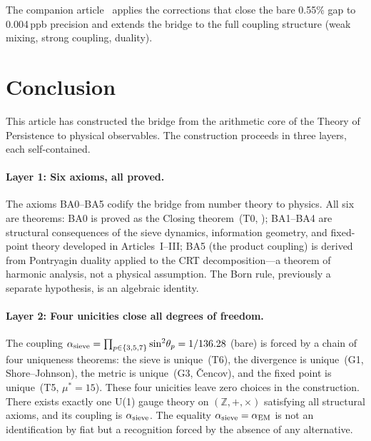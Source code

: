 \documentclass[12pt,a4paper]{article}
\begin{document}
\medskip
The companion article~\cite{companion_physics} applies the corrections that close the bare 0.55\% gap
to 0.004\,ppb precision and extends the bridge to the full
coupling structure (weak mixing, strong coupling, duality).


\newpage

\section{Conclusion}
\label{sec:conclusion}

This article has constructed the bridge from the arithmetic core of
the Theory of Persistence to physical observables.  The construction
proceeds in three layers, each self-contained.

\paragraph{Layer 1: Six axioms, all proved.}
The axioms BA0--BA5 codify the bridge from number theory to physics.
All six are theorems: BA0 is proved as the Closing theorem~(T0,
\cite{companion_M3}); BA1--BA4 are structural consequences of the
sieve dynamics, information geometry, and fixed-point theory developed
in Articles~I--III; BA5 (the product coupling) is derived from
Pontryagin duality applied to the CRT decomposition---a theorem of
harmonic analysis, not a physical assumption.  The Born rule, previously
a separate hypothesis, is an algebraic identity.

\paragraph{Layer 2: Four unicities close all degrees of freedom.}
The coupling $\alpha_{\rm sieve} = \prod_{p \in \{3,5,7\}}
\sin^2\!\theta_p = 1/136.28$ (bare) is forced by a chain of four
uniqueness theorems: the sieve is unique~(T6), the divergence is
unique~(G1, Shore--Johnson), the metric is unique~(G3, \v{C}encov),
and the fixed point is unique~(T5, $\mu^* = 15$).  These four
unicities leave zero choices in the construction.  There exists exactly
one U(1) gauge theory on $(\mathbb{Z}, +, \times)$ satisfying all
structural axioms, and its coupling is $\alpha_{\rm sieve}$.  The
equality $\alpha_{\rm sieve} = \alpha_{\rm EM}$ is not an
identification by fiat but a recognition forced by the absence of any
alternative.
\end{document}
